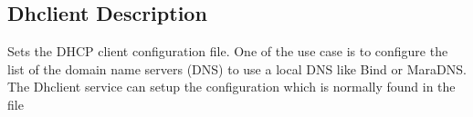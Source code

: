 \subsection{Dhclient Description}

Sets the DHCP client configuration file. One of the use case is to configure the list of the domain name servers (DNS) to use a local DNS like Bind or MaraDNS. The Dhclient service can setup the configuration which is normally found in the file 
